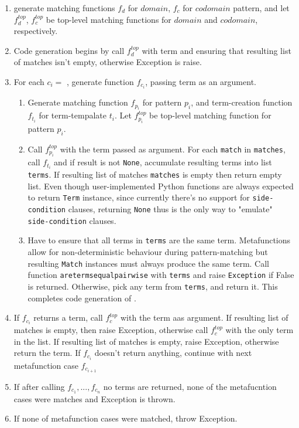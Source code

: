\begin{enumerate}
\item generate matching functions $f_d$ for $domain$, $f_c$ for $codomain$ pattern, and let $f_d^{top}$, $f_c^{top}$ be top-level matching functions for $domain$ and $codomain$, respectively.
\item Code generation begins by call $f_d^{top}$ with term and ensuring that resulting list of matches isn't empty, otherwise Exception is raise.
\item For each $c_i =$ \MetafunctionCase, generate function $f_{c_i}$, passing term as an argument.
\begin{enumerate}
	\item Generate matching function $f_{p_i}$ for pattern $p_i$, and term-creation function $f_{t_i}$ for term-tempalate $t_i$. Let $f_{p_i}^{top}$ be top-level matching function for pattern $p_i$.
	\item Call $f_{p_i}^{top}$ with the term passed as argument. For each \texttt{match} in \texttt{matches}, call $f_{t_i}$ and if result is not \texttt{None}, accumulate resulting terms into list \texttt{terms}. If resulting list of matches \texttt{matches} is empty then return empty list. Even though user-implemented Python functions are always expected to return \texttt{Term} instance, since currently there's no support for \texttt{side-condition} clauses, returning \texttt{None} thus is the only way to "emulate" \texttt{side-condition} clauses. 
	\item Have to ensure that all terms in \texttt{terms} are the same term. Metafunctions allow for non-deterministic behaviour during pattern-matching but resulting \texttt{Match} instances must always produce the same term.  Call function \texttt{aretermsequalpairwise} with \texttt{terms} and raise \texttt{Exception} if False is returned. Otherwise, pick any term from \texttt{terms}, and return it.
	This completes code generation of \MetafunctionCase.
\end{enumerate}
\item If $f_{c_i}$ returns a term, call $f_c^{top}$ with the term aas argument. If resulting list of matches is empty, then raise Exception, otherwise call $f_c^{top}$ with the only term in the list. If resulting list of matches is empty, raise Exception, otherwise return the term. If $f_{c_i}$ doesn't return anything, continue with next metafunction case $f_{c_{i+1}}$
\item If after calling $f_{c_1}, ..., f_{c_n}$ no terms are returned, none of the metafucntion cases were matches and Exception is thrown.
\item If none of metafunction cases were matched, throw Exception.
\end{enumerate}

